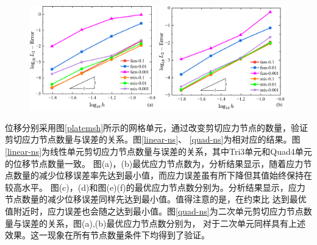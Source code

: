\begin{figure}[H]
    \centering
    \begin{subcaptiongroup}
    \includegraphics[width=0.49\textwidth]{figures/shearlocking/T6-l2-h.png}
    \label{T6-l2-h}
    \includegraphics[width=0.49\textwidth]{figures/shearlocking/Q8-l2-h.png}
    \label{Q8-l2-h}
    \end{subcaptiongroup}
\caption{}
\label{quad-l2}
\end{figure}
位移分别采用图\ref{platemsh}所示的网格单元，通过改变剪切应力节点的数量，验证剪切应力节点数量与误差的关系。图\ref{linear-ns}、
\ref{quad-ns}为相对应的结果。图\ref{linear-ns}为线性单元剪切应力节点数量与误差的关系，其中Tri3单元和Quad4单元的位移节点数量一致。
图(a)，(b)最优应力节点数为，分析结果显示，随着应力节点数量的减少位移误差率先达到最小值，而应力误差虽有所下降但其值始终保持在较高水平。
图(c)，(d)和图(e)(f)的最优应力节点数分别为。分析结果显示，应力节点数量的减少位移误差同样先达到最小值。值得注意的是，在约束比
达到最优值附近时，应力误差也会随之达到最小值。图\ref{quad-ns}为二次单元剪切应力节点数量与误差的关系，图(a),(b)最优应力节点数分别为，
对于二次单元同样具有上述效果。这一现象在所有节点数量条件下均得到了验证。
